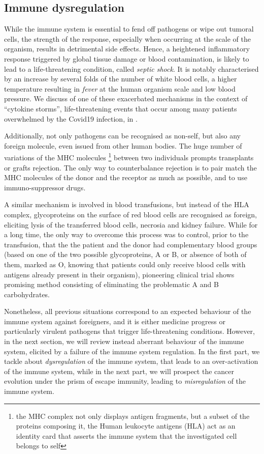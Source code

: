 \subsection{Immune dysregulation}

While the immune system is essential to fend off pathogens or wipe out tumoral cells, the strength of the response, especially when occurring at the scale of the organism, results in  detrimental side effects. Hence, a heightened inflammatory response triggered by global tissue damage or blood contamination, is likely to lead to a life-threatening condition, called \textit{septic shock}. It is notably characterised by an increase by several folds of the number of white blood cells, a higher temperature resulting in \textit{fever} at the human organism scale and low blood pressure. We discuss of one of these exacerbated mechanisms in the context of \enquote{cytokine storms}, life-threatening events that occur among many patients overwhelmed by the Covid19 infection, in . 

Additionally, not only pathogens can be recognised as non-self, but also any foreign molecule, even issued from other human bodies. The huge number of variations of the  MHC molecules \footnote{the MHC complex not only displays antigen fragments, but a subset of the proteins composing it, the Human leukocyte antigens (HLA) act as an identity card that asserts the immune system that the investigated cell belongs to self} between two individuals prompts transplants or grafts rejection. The only way to counterbalance rejection is to pair match the MHC molecules of the donor and the receptor as much as possible, and to use immuno-suppressor drugs.

A similar mechanism is involved in blood transfusions, but instead of the HLA complex, glycoproteins on the surface of red blood cells are recognised as foreign, eliciting lysis of the transferred blood cells, necrosia and kidney failure. While for a long time, the only way to overcome this process was to control, prior to the transfusion, that the the patient and the donor had complementary blood groups (based on one of the two possible glycoproteins, A or B,  or absence of both of them, marked as O, knowing that patients could only receive blood cells with antigens already present in their organism), pioneering clinical trial shows promising method consisting of eliminating the problematic A and B carbohydrates.   


Nonetheless, all previous situations correspond to an expected behaviour of the immune system against foreigners, and it is either medicine progress or particularly virulent pathogens that trigger life-threatening conditions. However, in the next section, we will review instead aberrant behaviour of the immune system, elicited by a failure of the immune system regulation. In the first part, we tackle about \textit{dysregulation} of the immune system, that leads to an over-activation of the immune system, while in the next part, we will prospect the cancer evolution under the prism of escape immunity, leading to \textit{misregulation} of the immune system. 


